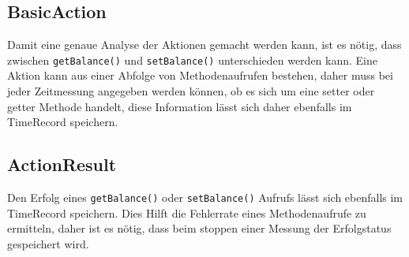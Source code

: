 \subsection{BasicAction}
\label{sec:BasicAction}
Damit eine genaue Analyse der Aktionen ge\-macht werden kann, ist es nö\-tig, dass zwi\-schen \verb+getBalance()+ und \verb+setBalance()+ un\-ter\-schieden wer\-den kann. Eine Aktion kann aus einer Abfolge von Methoden\-auf\-rufen bestehen, daher muss bei jeder Zeitmessung angegeben werden können, ob es sich um eine setter oder getter Methode handelt, diese Information lässt sich daher ebenfalls im TimeRecord speichern.

\subsection{ActionResult}
\label{sec:ActionResult}
Den Erfolg eines \verb+getBalance()+ oder \verb+setBalance()+ Aufrufs lässt sich ebenfalls im TimeRecord speichern. Dies Hilft die Fehlerrate eines Methodenaufrufe zu ermitteln, daher ist es nötig, dass beim stoppen einer Messung der Erfolgstatus gespeichert wird. 

